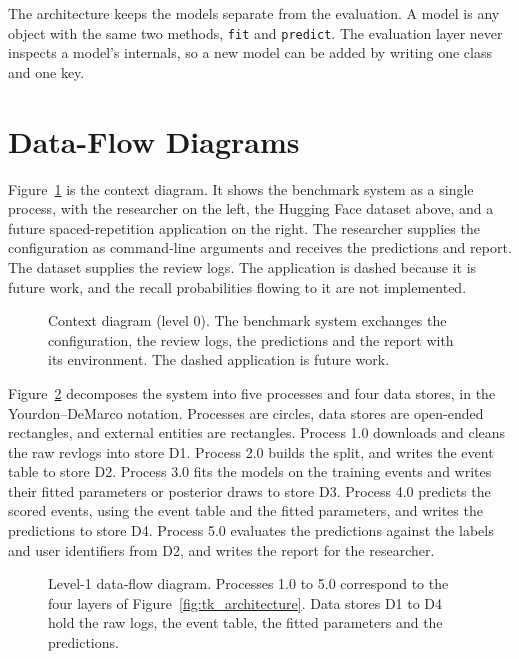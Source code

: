 The architecture keeps the models separate from the evaluation. A model is any object with the same two
methods, \texttt{fit} and \texttt{predict}. The evaluation layer never inspects a model's internals, so a new
model can be added by writing one class and one key.

\section{Data-Flow Diagrams}
\label{sec:design-dfd}

Figure~\ref{fig:tk_dfd0} is the context diagram. It shows the benchmark system as a single process, with the
researcher on the left, the Hugging Face dataset above, and a future spaced-repetition application on the right.
The researcher supplies the configuration as command-line arguments and receives the predictions and report. The
dataset supplies the review logs. The application is dashed because it is future work, and the recall
probabilities flowing to it are not implemented.

\begin{figure}[htbp]
  \centering
  
  \caption{Context diagram (level 0). The benchmark system exchanges the configuration, the review logs, the
    predictions and the report with its environment. The dashed application is future work.}
  \label{fig:tk_dfd0}
\end{figure}

Figure~\ref{fig:tk_dfd1} decomposes the system into five processes and four data stores, in the
Yourdon--DeMarco notation. Processes are circles, data stores are open-ended rectangles, and external entities are
rectangles. Process 1.0 downloads and cleans the raw revlogs into store D1. Process 2.0 builds the split, and
writes the event table to store D2. Process 3.0 fits the models on the training events and writes their fitted
parameters or posterior draws to store D3. Process 4.0 predicts the scored events, using the event table and the
fitted parameters, and writes the predictions to store D4. Process 5.0 evaluates the predictions against the labels and user identifiers from D2, and writes the report for the researcher.

\begin{figure}[htbp]
  \centering
  
  \caption{Level-1 data-flow diagram. Processes 1.0 to 5.0 correspond to the four layers of
    Figure~\ref{fig:tk_architecture}. Data stores D1 to D4 hold the raw logs, the event table, the fitted
    parameters and the predictions.}
  \label{fig:tk_dfd1}
\end{figure}


